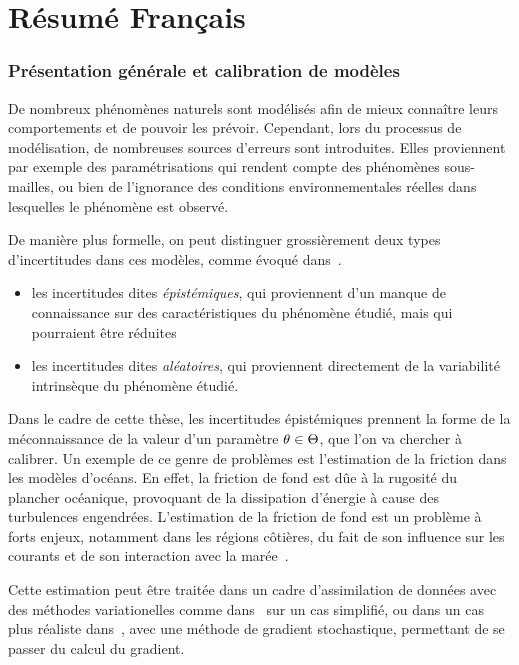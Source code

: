 \documentclass[../../Main_ManuscritThese.tex]{subfiles}
\begin{document}
\chapter*{Résumé Français}
\TitleBtwLines

{}
\label{chap:resume_fr}
\pagestyle{resumeStyle}

\subsection*{Présentation générale et calibration de modèles}
De nombreux phénomènes naturels sont modélisés afin de mieux connaître
leurs comportements et de pouvoir les prévoir.  Cependant, lors du
processus de modélisation, de nombreuses sources d'erreurs sont
introduites. Elles proviennent par exemple des paramétrisations qui
rendent compte des phénomènes sous-mailles, ou bien de l'ignorance des
conditions environnementales réelles dans lesquelles le phénomène est
observé.

De manière plus formelle, on peut distinguer grossièrement deux types d'incertitudes
dans ces modèles, comme évoqué dans~\cite{walker_defining_2003}.
\begin{itemize}
\item les incertitudes dites \emph{épistémiques}, qui proviennent d'un
  manque de connaissance sur des caractéristiques du phénomène
  étudié, mais qui pourraient être réduites
\item les incertitudes dites \emph{aléatoires}, qui proviennent
  directement de la variabilité intrinsèque du phénomène étudié.
\end{itemize}

Dans le cadre de cette thèse, les incertitudes épistémiques prennent
la forme de la méconnaissance de la valeur d'un paramètre
$\theta \in \Theta$, que l'on va chercher à calibrer.  Un exemple de ce
genre de problèmes est l'estimation de la friction dans les modèles
d'océans.  En effet, la friction de fond est dûe à la rugosité du
plancher océanique, provoquant de la dissipation d'énergie à cause des
turbulences engendrées. L'estimation de la friction de fond est un
problème à forts enjeux, notamment dans les régions côtières, du fait de
son influence sur les courants et de son interaction avec la
marée~\cite{sinha_principal_1997,boutet_estimation_2015}.

Cette estimation peut être traitée dans un cadre
d'assimilation de données avec des méthodes variationelles comme
dans~\cite{das_estimation_1991,das_variational_1992} sur un cas
simplifié, ou dans un cas plus réaliste
dans~\cite{boutet_estimation_2015}, avec une méthode de gradient
stochastique, permettant de se passer du calcul du gradient.
\end{document}
